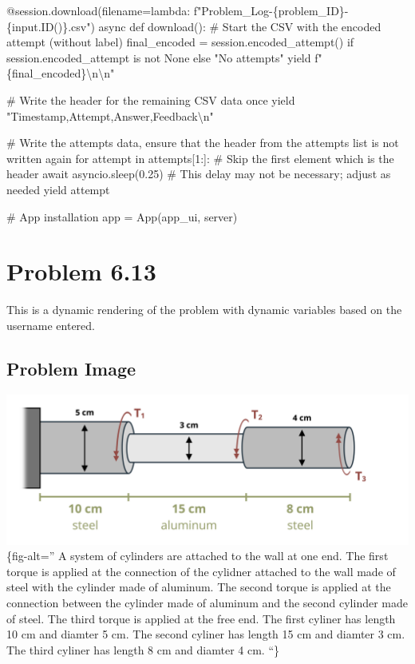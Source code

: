 \documentclass[
  letterpaper,
  DIV=11,
  numbers=noendperiod]{scrreprt}
\newenvironment{Shaded}{\begin{snugshade}}{\end{snugshade}}
\newcommand{\NormalTok}[1]{\textcolor[rgb]{0.00,0.23,0.31}{#1}}
\begin{document}
\begin{Shaded}
\begin{Highlighting}[]
\NormalTok{    @session.download(filename=lambda: f"Problem\_Log{-}\{problem\_ID\}{-}\{input.ID()\}.csv")}
\NormalTok{    async def download():}
\NormalTok{        \# Start the CSV with the encoded attempt (without label)}
\NormalTok{        final\_encoded = session.encoded\_attempt() if session.encoded\_attempt is not None else "No attempts"}
\NormalTok{        yield f"\{final\_encoded\}\textbackslash{}n\textbackslash{}n"}
        
\NormalTok{        \# Write the header for the remaining CSV data once}
\NormalTok{        yield "Timestamp,Attempt,Answer,Feedback\textbackslash{}n"}
        
\NormalTok{        \# Write the attempts data, ensure that the header from the attempts list is not written again}
\NormalTok{        for attempt in attempts[1:]:  \# Skip the first element which is the header}
\NormalTok{            await asyncio.sleep(0.25)  \# This delay may not be necessary; adjust as needed}
\NormalTok{            yield attempt}


\NormalTok{\# App installation}
\NormalTok{app = App(app\_ui, server)}
\end{Highlighting}
\end{Shaded}

\chapter*{Problem 6.13}\label{problem-6.13}


This is a dynamic rendering of the problem with dynamic variables based
on the username entered.

\section*{Problem Image}\label{problem-image-43}


\includegraphics{images/269.png}\{fig-alt='' A system of cylinders are
attached to the wall at one end. The first torque is applied at the
connection of the cylidner attached to the wall made of steel with the
cylinder made of aluminum. The second torque is applied at the
connection between the cylinder made of aluminum and the second cylinder
made of steel. The third torque is applied at the free end. The first
cyliner has length 10 cm and diamter 5 cm. The second cyliner has length
15 cm and diamter 3 cm. The third cyliner has length 8 cm and diamter 4
cm. ``\}
\end{document}
